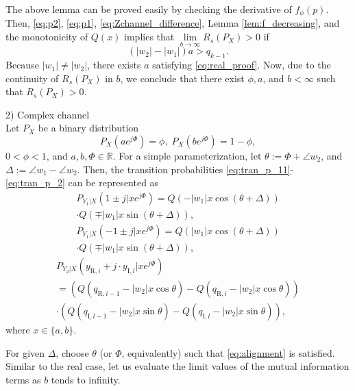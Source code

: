 \documentclass[journal]{IEEEtran}
\begin{document}
\begin{IEEEproof}
The above lemma can be proved easily by checking the derivative of $f_\phi (p)$.
Then, \eqref{eq:p2}, \eqref{eq:p1}, \eqref{eq:Zchannel_difference}, Lemma \ref{lem:f_decreasing}, and the monotonicity of $Q(x)$ implies that $\lim\limits_{b \rightarrow \infty} R_s(P_X)>0$ if
\begin{equation}
    (|w_2|-|w_1|)a>q_{k-1}. \label{eq:real_proof}
\end{equation}
Because $|w_1| \neq |w_2|$, there exists $a$ satisfying \eqref{eq:real_proof}.
Now, due to the continuity of $R_s(P_X)$ in $b$, we conclude that there exist $\phi,a$, and $b<\infty$ such that $R_s(P_X)>0$. 

2) Complex channel
\\ \indent Let $P_X$ be a binary distribution 
\begin{equation}
    P_X(ae^{j\Phi}) = \phi, \; P_X(be^{j\Phi}) = 1-\phi, \label{eq:C_binary_dist}
\end{equation}
$0<\phi<1$, and $a,b,\Phi \in \mathbb{R}$. For a simple parameterization, let ${\theta := \Phi + \angle w_2}$, and $\Delta := \angle w_1 - \angle w_2$.
Then, the transition probabilities \eqref{eq:tran_p_11}-\eqref{eq:tran_p_2} can be represented as
\begin{multline}
    P_{Y_1|X}( 1 \pm j|xe^{j\Phi}) = Q( - |w_1|x\cos(\theta+\Delta)) \\ \cdot Q( \mp |w_1|x\sin(\theta+\Delta)),
\end{multline}
\begin{multline}
    P_{Y_1|X}(- 1 \pm j|xe^{j\Phi}) = Q( |w_1|x\cos(\theta+\Delta)) \\ \cdot Q( \mp |w_1|x\sin(\theta+\Delta)),
\end{multline}
\begin{multline}
    P_{Y_2|X}(y_{\mathrm{R},i}+j\cdot y_{\mathrm{I},l}|xe^{j\Phi})
    \\= \left(Q\left( q_{\mathrm{R},i-1}-|w_2|x\cos\theta \right) - Q\left( q_{\mathrm{R},i}-|w_2|x\cos\theta \right) \right)
    \\ \cdot \left(Q\left( q_{\mathrm{I},l-1}-|w_2|x\sin\theta \right) - Q\left( q_{\mathrm{I},l}-|w_2|x\sin\theta \right) \right),
\end{multline}
where $x \in \{a,b\}$.

For given $\Delta$, choose $\theta$ (or $\Phi$, equivalently) such that \eqref{eq:alignment} is satisfied.  Similar to the real case, let us evaluate the limit values of the mutual information terms as $b$ tends to infinity. 


\end{IEEEproof}
\end{document}
